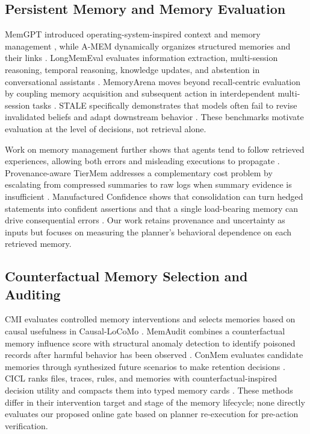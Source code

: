 \documentclass[11pt]{article}
\begin{document}
\subsection{Persistent Memory and Memory Evaluation}

MemGPT introduced operating-system-inspired context and memory management \cite{packer2023memgpt}, while A-MEM dynamically organizes structured memories and their links \cite{xu2025amem}. LongMemEval evaluates information extraction, multi-session reasoning, temporal reasoning, knowledge updates, and abstention in conversational assistants \cite{wu2025longmemeval}. MemoryArena moves beyond recall-centric evaluation by coupling memory acquisition and subsequent action in interdependent multi-session tasks \cite{he2026memoryarena}. STALE specifically demonstrates that models often fail to revise invalidated beliefs and adapt downstream behavior \cite{chao2026stale}. These benchmarks motivate evaluation at the level of decisions, not retrieval alone.

Work on memory management further shows that agents tend to follow retrieved experiences, allowing both errors and misleading executions to propagate \cite{xiong2026memory}. Provenance-aware TierMem addresses a complementary cost problem by escalating from compressed summaries to raw logs when summary evidence is insufficient \cite{zhu2026tiermem}. Manufactured Confidence shows that consolidation can turn hedged statements into confident assertions and that a single load-bearing memory can drive consequential errors \cite{kwon2026confidence}. Our work retains provenance and uncertainty as inputs but focuses on measuring the planner's behavioral dependence on each retrieved memory.

\subsection{Counterfactual Memory Selection and Auditing}

CMI evaluates controlled memory interventions and selects memories based on causal usefulness in Causal-LoCoMo \cite{srivastava2026cmi}. MemAudit combines a counterfactual memory influence score with structural anomaly detection to identify poisoned records after harmful behavior has been observed \cite{tan2026memaudit}. ConMem evaluates candidate memories through synthesized future scenarios to make retention decisions \cite{zhang2026conmem}. CICL ranks files, traces, rules, and memories with counterfactual-inspired decision utility and compacts them into typed memory cards \cite{guan2026cicl}. These methods differ in their intervention target and stage of the memory lifecycle; none directly evaluates our proposed online gate based on planner re-execution for pre-action verification.
\end{document}
